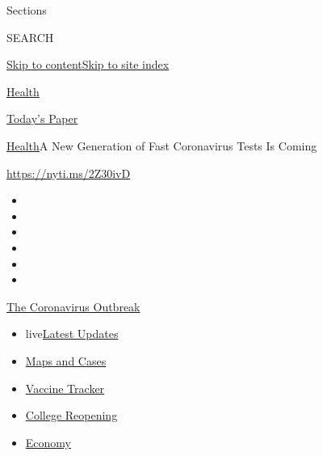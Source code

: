 Sections

SEARCH

\protect\hyperlink{site-content}{Skip to
content}\protect\hyperlink{site-index}{Skip to site index}

\href{https://www.nytimes3xbfgragh.onion/section/health}{Health}

\href{https://myaccount.nytimes3xbfgragh.onion/auth/login?response_type=cookie\&client_id=vi}{}

\href{https://www.nytimes3xbfgragh.onion/section/todayspaper}{Today's
Paper}

\href{/section/health}{Health}\textbar{}A New Generation of Fast
Coronavirus Tests Is Coming

\url{https://nyti.ms/2Z30ivD}

\begin{itemize}
\item
\item
\item
\item
\item
\item
\end{itemize}

\href{https://www.nytimes3xbfgragh.onion/news-event/coronavirus?action=click\&pgtype=Article\&state=default\&region=TOP_BANNER\&context=storylines_menu}{The
Coronavirus Outbreak}

\begin{itemize}
\tightlist
\item
  live\href{https://www.nytimes3xbfgragh.onion/2020/08/04/world/coronavirus-cases.html?action=click\&pgtype=Article\&state=default\&region=TOP_BANNER\&context=storylines_menu}{Latest
  Updates}
\item
  \href{https://www.nytimes3xbfgragh.onion/interactive/2020/us/coronavirus-us-cases.html?action=click\&pgtype=Article\&state=default\&region=TOP_BANNER\&context=storylines_menu}{Maps
  and Cases}
\item
  \href{https://www.nytimes3xbfgragh.onion/interactive/2020/science/coronavirus-vaccine-tracker.html?action=click\&pgtype=Article\&state=default\&region=TOP_BANNER\&context=storylines_menu}{Vaccine
  Tracker}
\item
  \href{https://www.nytimes3xbfgragh.onion/2020/08/02/us/covid-college-reopening.html?action=click\&pgtype=Article\&state=default\&region=TOP_BANNER\&context=storylines_menu}{College
  Reopening}
\item
  \href{https://www.nytimes3xbfgragh.onion/live/2020/08/04/business/stock-market-today-coronavirus?action=click\&pgtype=Article\&state=default\&region=TOP_BANNER\&context=storylines_menu}{Economy}
\end{itemize}

